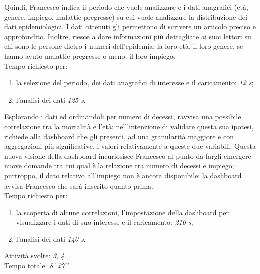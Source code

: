 Quindi, Francesco indica il periodo che vuole analizzare e i dati anagrafici (età, genere, impiego, malattie pregresse) su cui vuole analizzare la distribuzione dei dati epidemiologici.
I dati ottenuti gli permettono di scrivere un articolo preciso e approfondito. Inoltre, riesce a dare informazioni più dettagliate ai suoi lettori su chi sono le persone dietro i numeri dell'epidemia: la loro età, il loro genere, se hanno avuto malattie pregresse o meno, il loro impiego.\\
Tempo richiesto per:
\begin{enumerate}
    \item la selezione del periodo, dei dati anagrafici di interesse e il caricamento: \textit{12 s};
    \item l'analisi dei dati \textit{125 s}.
\end{enumerate}\noindent

Esplorando i dati ed ordinandoli per numero di decessi, ravvisa una possibile correlazione tra la mortalità e l'età: nell'intenzione di validare questa sua ipotesi, richiede alla dashboard che gli presenti, ad una granularità maggiore e con aggregazioni più significative, i valori relativamente a queste due variabili. 
Questa nuova visione della dashboard incuriosisce Francesco al punto da fargli emergere nuove domande tra cui qual è la relazione tra numero di decessi e impiego; purtroppo, il dato relativo all'impiego non è ancora disponibile: la dashboard avvisa Francesco che sarà inserito quanto prima.\\
Tempo richiesto per:
\begin{enumerate}
    \item la scoperta di alcune correlazioni, l'impostazione della dashboard per visualizzare i dati di suo interesse e il caricamento: \textit{210 s};
    \item l'analisi dei dati \textit{140 s}.
\end{enumerate}\noindent

Attività svolte: \hyperref[itm:3]{\textit{3}}, \hyperref[itm:4]{\textit{4}}.\\ 
Tempo totale: \textit{8' 27''} 

